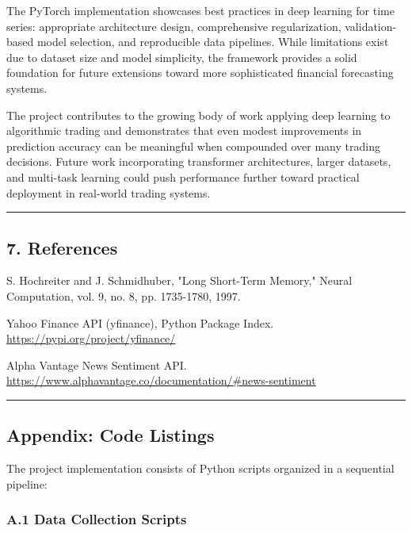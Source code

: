 \documentclass[
]{article}
\begin{document}
The PyTorch implementation showcases best practices in deep learning for
time series: appropriate architecture design, comprehensive
regularization, validation-based model selection, and reproducible data
pipelines. While limitations exist due to dataset size and model
simplicity, the framework provides a solid foundation for future
extensions toward more sophisticated financial forecasting systems.

The project contributes to the growing body of work applying deep
learning to algorithmic trading and demonstrates that even modest
improvements in prediction accuracy can be meaningful when compounded
over many trading decisions. Future work incorporating transformer
architectures, larger datasets, and multi-task learning could push
performance further toward practical deployment in real-world trading
systems.

\begin{center}\rule{0.5\linewidth}{0.5pt}\end{center}

\subsection{7. References}\label{7-references}

S. Hochreiter and J. Schmidhuber, "Long Short-Term Memory," Neural
Computation, vol. 9, no. 8, pp. 1735-1780, 1997.

Yahoo Finance API (yfinance), Python Package Index.
\url{https://pypi.org/project/yfinance/}

Alpha Vantage News Sentiment API.
\url{https://www.alphavantage.co/documentation/\#news-sentiment}

\begin{center}\rule{0.5\linewidth}{0.5pt}\end{center}

\subsection{Appendix: Code Listings}\label{appendix-code-listings}

The project implementation consists of Python scripts organized in a
sequential pipeline:

\subsubsection{A.1 Data Collection
Scripts}\label{a1-data-collection-scripts}
\end{document}
